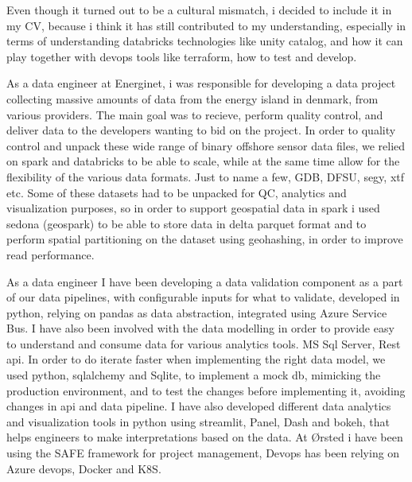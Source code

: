 Even though it turned out to be a cultural mismatch, i decided to include it in my CV, because i think it has still contributed to my understanding, especially in terms of understanding databricks technologies like unity catalog, and how it can play together with devops tools like terraform, how to test and develop.

       
\divider

As a data engineer at Energinet, i was responsible for developing a data project collecting massive amounts of data from the energy island in denmark, from various providers.
 The main goal was to recieve, perform quality control, and deliver data to the developers wanting to bid on the project.
 In order to quality control and unpack these wide range of binary offshore sensor data files, we relied on spark and databricks to be able to scale, while at the same time allow for the flexibility of the various data formats.
 Just to name a few, GDB, DFSU, segy, xtf etc.
 Some of these datasets had to be unpacked for QC, analytics and visualization purposes, so in order to support geospatial data in spark i used sedona (geospark) to be able to store data in delta parquet format and to perform spatial partitioning on the dataset using geohashing, in order to improve read performance.

             
\divider

As a data engineer I have been developing a data validation component as a part of our data pipelines, with configurable inputs for what to validate, developed in python, relying on pandas as data abstraction, integrated using Azure Service Bus.
 I have also been involved with the data modelling in order to provide easy to understand and consume data for various analytics tools.
 MS Sql Server, Rest api.
 In order to do iterate faster when implementing the right data model, we used python, sqlalchemy and Sqlite, to implement a mock db, mimicking the production environment, and to test the changes before implementing it, avoiding changes in api and data pipeline.
 I have also developed different data analytics and visualization tools in python using streamlit, Panel, Dash and bokeh, that helps engineers to make interpretations based on the data.
 At Ørsted i have been using the SAFE framework for project management, Devops has been relying on Azure devops, Docker and K8S.

